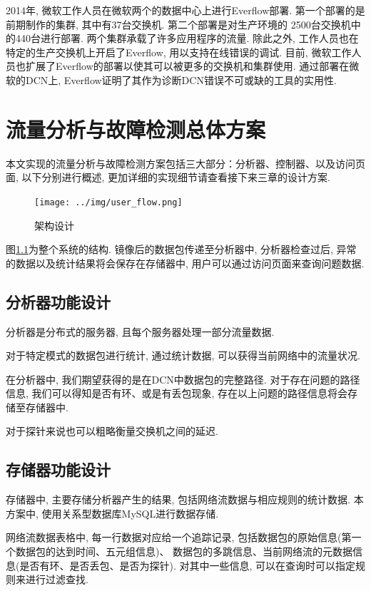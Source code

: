   2014年, 微软工作人员在微软两个的数据中心上进行Everflow部署.
第一个部署的是前期制作的集群, 其中有37台交换机. 第二个部署是对生产环境的
2500台交换机中的440台进行部署. 两个集群承载了许多应用程序的流量.
除此之外, 工作人员也在特定的生产交换机上开启了Everflow, 用以支持在线错误的调试.
目前, 微软工作人员也扩展了Everflow的部署以使其可以被更多的交换机和集群使用.
通过部署在微软的DCN上, Everflow证明了其作为诊断DCN错误不可或缺的工具的实用性.

\chapter{流量分析与故障检测总体方案}

本文实现的流量分析与故障检测方案包括三大部分：分析器、控制器、以及访问页面, 以下分别进行概述,
更加详细的实现细节请查看接下来三章的设计方案.

\begin{figure}
  \centering
  \texttt{[image: ../img/user\_flow.png]}
  \caption{架构设计}
  \label{fig:arch}
\end{figure}

图\ref{fig:arch}为整个系统的结构. 镜像后的数据包传递至分析器中, 分析器检查过后,
异常的数据以及统计结果将会保存在存储器中, 用户可以通过访问页面来查询问题数据.

\section{分析器功能设计}

  分析器是分布式的服务器, 且每个服务器处理一部分流量数据.

  对于特定模式的数据包进行统计, 通过统计数据, 可以获得当前网络中的流量状况.

  在分析器中, 我们期望获得的是在DCN中数据包的完整路径. 对于存在问题的路径信息,
我们可以得知是否有环、或是有丢包现象, 存在以上问题的路径信息将会存储至存储器中.

  对于探针来说也可以粗略衡量交换机之间的延迟.

\section{存储器功能设计}

存储器中, 主要存储分析器产生的结果, 包括网络流数据与相应规则的统计数据.
本方案中, 使用关系型数据库MySQL\cite{mysql}进行数据存储.

网络流数据表格中, 每一行数据对应给一个追踪记录,
包括数据包的原始信息(第一个数据包的达到时间、五元组信息)、
数据包的多跳信息、当前网络流的元数据信息(是否有环、是否丢包、是否为探针).
对其中一些信息, 可以在查询时可以指定规则来进行过滤查找.

